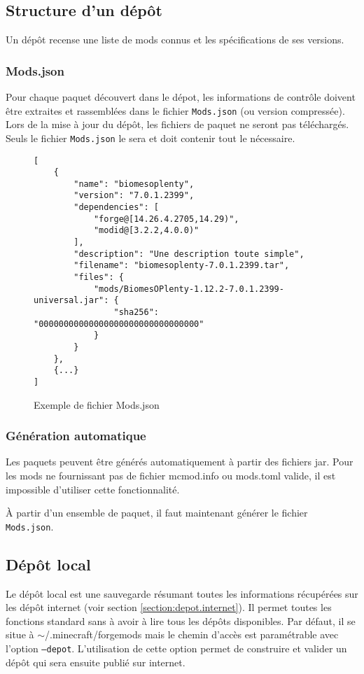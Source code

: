 \documentclass{article}
\begin{document}
\subsection{Structure d'un dépôt}
Un dépôt recense une liste de mods connus et les spécifications de ses versions.

\subsubsection{Mods.json}
Pour chaque paquet découvert dans le dépot, les informations de contrôle doivent être extraites et rassemblées dans le fichier \texttt{Mods.json} (ou version compressée).
Lors de la mise à jour du dépôt, les fichiers de paquet ne seront pas téléchargés.
Seuls le fichier \texttt{Mods.json} le sera et doit contenir tout le nécessaire.

\begin{figure}[h]
\begin{verbatim}
[
    {
        "name": "biomesoplenty",
        "version": "7.0.1.2399",
        "dependencies": [
            "forge@[14.26.4.2705,14.29)",
            "modid@[3.2.2,4.0.0)"
        ],
        "description": "Une description toute simple",
        "filename": "biomesoplenty-7.0.1.2399.tar",
        "files": {
            "mods/BiomesOPlenty-1.12.2-7.0.1.2399-universal.jar": {
                "sha256": "00000000000000000000000000000000"
            }
        }
    },
    {...}
]
\end{verbatim}
\caption{Exemple de fichier \textsf{Mods.json}}
\label{fig:Mods.json}
\end{figure}

\subsubsection{Génération automatique}
Les paquets peuvent être générés automatiquement à partir des fichiers jar.
Pour les mods ne fournissant pas de fichier \textsf{mcmod.info} ou \textsf{mods.toml} valide, il est impossible d'utiliser cette fonctionnalité.

À partir d'un ensemble de paquet, il faut maintenant générer le fichier \texttt{Mods.json}.


\subsection{Dépôt local}
\label{section:depot.local}
Le dépôt local est une sauvegarde résumant toutes les informations récupérées sur les dépôt internet (voir section \ref{section:depot.internet}).
Il permet toutes les fonctions standard sans à avoir à lire tous les dépôts disponibles.
Par défaut, il se situe à \textsf{$\sim$/.minecraft/forgemods} mais le chemin d'accès est paramétrable avec l'option \texttt{--depot}.
L'utilisation de cette option permet de construire et valider un dépôt qui sera ensuite publié sur internet.
\end{document}

